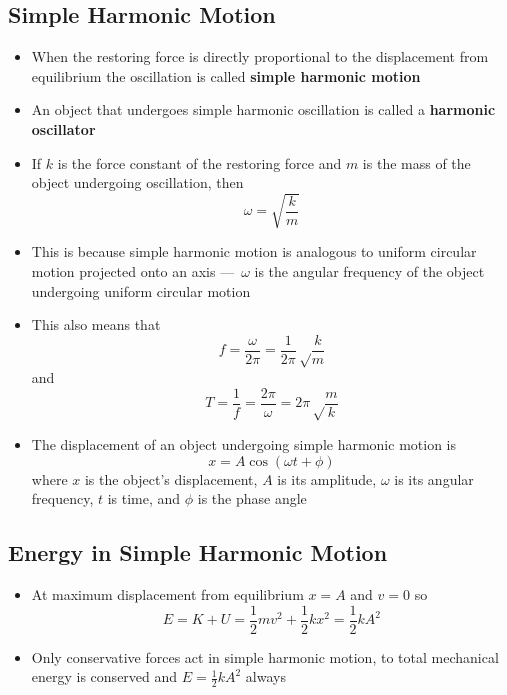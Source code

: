 \documentclass{article}
\begin{document}
\subsection{Simple Harmonic Motion}

\begin{itemize}
  \item When the restoring force is directly proportional to the displacement from equilibrium the oscillation is called \textbf{simple harmonic motion}

  \item An object that undergoes simple harmonic oscillation is called a \textbf{harmonic oscillator}

  \item If $k$ is the force constant of the restoring force and $m$ is the mass of the object undergoing oscillation, then \[\omega = \sqrt{\frac{k}{m}}\]

  \item This is because simple harmonic motion is analogous to uniform circular motion projected onto an axis — $\omega$ is the angular frequency of the object undergoing uniform circular motion

  \item This also means that \[f = \frac \omega {2 \pi} = \frac 1 {2\pi} \sqrt \frac k m\] and \[T = \frac 1 f = \frac {2\pi} \omega = 2 \pi \sqrt \frac m k\]

  \item The displacement of an object undergoing simple harmonic motion is \[x = A\cos(\omega t + \phi)\] where $x$ is the object's displacement, $A$ is its amplitude, $\omega$ is its angular frequency, $t$ is time, and $\phi$ is the phase angle
\end{itemize}

\subsection{Energy in Simple Harmonic Motion}

\begin{itemize}
  \item At maximum displacement from equilibrium $x=A$ and $v=0$ so \[E=K+U=\frac{1}{2}mv^2+\frac{1}{2}kx^2=\frac{1}{2}kA^2\]

  \item Only conservative forces act in simple harmonic motion, to total mechanical energy is conserved and $E=\frac{1}{2}kA^2$ always
\end{itemize}
\end{document}
